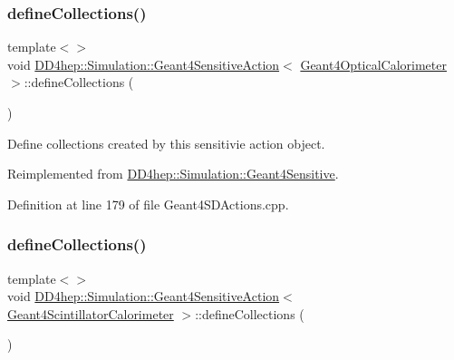 \subsubsection{\texorpdfstring{define\+Collections()}{defineCollections()}\hspace{0.1cm}{\footnotesize\ttfamily [3/7]}}
{\footnotesize\ttfamily template$<$$>$ \\
void \hyperlink{class_d_d4hep_1_1_simulation_1_1_geant4_sensitive_action}{D\+D4hep\+::\+Simulation\+::\+Geant4\+Sensitive\+Action}$<$ \hyperlink{struct_d_d4hep_1_1_simulation_1_1_geant4_optical_calorimeter}{Geant4\+Optical\+Calorimeter} $>$\+::define\+Collections (\begin{DoxyParamCaption}{ }\end{DoxyParamCaption})\hspace{0.3cm}{\ttfamily [virtual]}}



Define collections created by this sensitivie action object. 



Reimplemented from \hyperlink{class_d_d4hep_1_1_simulation_1_1_geant4_sensitive_a88c872b79e49e399c8ee282960c2d77d}{D\+D4hep\+::\+Simulation\+::\+Geant4\+Sensitive}.



Definition at line 179 of file Geant4\+S\+D\+Actions.\+cpp.

\hypertarget{class_d_d4hep_1_1_simulation_1_1_geant4_sensitive_action_ac21d5f2e63b47e87de641e3920d245e8}{}\label{class_d_d4hep_1_1_simulation_1_1_geant4_sensitive_action_ac21d5f2e63b47e87de641e3920d245e8} 
\subsubsection{\texorpdfstring{define\+Collections()}{defineCollections()}\hspace{0.1cm}{\footnotesize\ttfamily [4/7]}}
{\footnotesize\ttfamily template$<$$>$ \\
void \hyperlink{class_d_d4hep_1_1_simulation_1_1_geant4_sensitive_action}{D\+D4hep\+::\+Simulation\+::\+Geant4\+Sensitive\+Action}$<$ \hyperlink{struct_d_d4hep_1_1_simulation_1_1_geant4_scintillator_calorimeter}{Geant4\+Scintillator\+Calorimeter} $>$\+::define\+Collections (\begin{DoxyParamCaption}{ }\end{DoxyParamCaption})\hspace{0.3cm}{\ttfamily [virtual]}}



